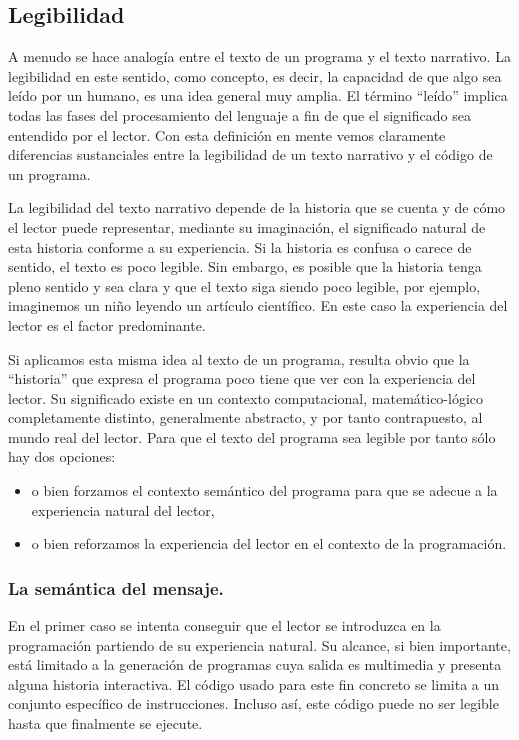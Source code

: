 \documentclass{llncs}
\begin{document}
\subsection{Legibilidad}
\label{subsec:readability}
A menudo se hace analogía entre el texto de un programa y el texto narrativo. La legibilidad en este sentido, como concepto, es decir, la capacidad de que algo sea leído por un humano, es una idea general muy amplia. El término ``leído'' implica todas las fases del procesamiento del lenguaje a fin de que el significado sea entendido por el lector. Con esta definición en mente vemos claramente diferencias sustanciales entre la legibilidad de un texto narrativo y el código de un programa. 

La legibilidad del texto narrativo depende de la historia que se cuenta y de cómo el lector puede representar, mediante su imaginación, el significado natural de esta historia conforme a su experiencia. Si la historia es confusa o carece de sentido, el texto es poco legible. Sin embargo, es posible que la historia tenga pleno sentido y sea clara y que el texto siga siendo poco legible, por ejemplo, imaginemos un niño leyendo un artículo científico. En este caso la experiencia del lector es el factor predominante. 

Si aplicamos esta misma idea al texto de un programa, resulta obvio que la ``historia'' que expresa el programa poco tiene que ver con la experiencia del lector. Su significado existe en un contexto computacional, matemático-lógico completamente distinto, generalmente abstracto, y por tanto contrapuesto, al mundo real del lector. Para que el texto del programa sea legible por tanto sólo hay dos opciones: 

\begin{itemize}
\item o bien forzamos el contexto semántico del programa para que se adecue a la experiencia natural del lector, 
\item o bien reforzamos la experiencia del lector en el contexto de la programación. 
\end{itemize}

\subsubsection{La semántica del mensaje.}
\label{subsec:message}

En el primer caso se intenta conseguir que el lector se introduzca en la programación partiendo de su experiencia natural. Su alcance, si bien importante, está limitado a la generación de programas cuya salida es multimedia y presenta alguna historia interactiva. El código usado para este fin concreto se limita a un conjunto específico de instrucciones. Incluso así, este código puede no ser legible hasta que finalmente se ejecute. 
\end{document}
